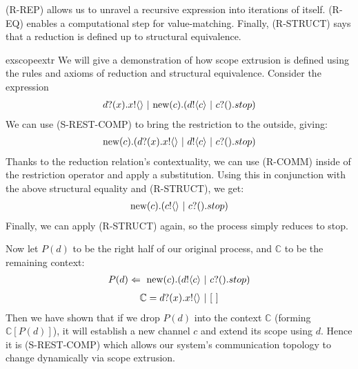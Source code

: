 (R-REP)  allows us to unravel a recursive expression into iterations of itself.  
(R-EQ) enables a computational step for value-matching.  
Finally, (R-STRUCT) says that a reduction is defined up to structural equivalence.
\begin{example}{exscopeextr}
	We will give a demonstration of how scope extrusion is defined using the rules and axioms of reduction and structural equivalence.  
Consider the expression 
\begin{align}
	{d}?({x}).{x}!\langle{}\rangle\ |\  \text{new}({c}).({d}!\langle{c}\rangle \ |\  {c}?({}).stop)	
\end{align}
We can use (S-REST-COMP) to bring the restriction to the outside, giving:
\begin{align}
	\text{new}({c}).({d}?({x}).{x}!\langle{}\rangle\ |\  {d}!\langle{c}\rangle \ |\  {c}?({}).stop)		
\end{align}
	Thanks to the reduction relation's contextuality, we can use (R-COMM) inside of the restriction operator and apply a substitution.  
Using this in conjunction with the above structural equality and (R-STRUCT), we get:
	\begin{align}
		\text{new}({c}).({c}!\langle{}\rangle \ |\  {c}?({}).stop)
	\end{align}
	Finally, we can apply (R-STRUCT) again, so the process simply reduces to stop.  


	Now let $P(d)$ to be the right half of our original process, and $\mathbb{C}$ to be the remaining context:
	\begin{align}
		P(d) \Leftarrow\  \text{new}({c}).({d}!\langle{c}\rangle \ |\  {c}?({}).stop)
	\end{align}
	\begin{align}
		\mathbb{C} = {d}?({x}).{x}!\langle{}\rangle \ |\  [\ ]
	\end{align}
Then we have shown that if we drop $P(d)$ into the context $\mathbb{C}$ (forming $\mathbb{C}[P(d)]$), it will establish a new channel $c$ and extend its scope using $d$.  
Hence it is (S-REST-COMP) which allows our system's communication topology to change dynamically via scope extrusion.
\end{example}
